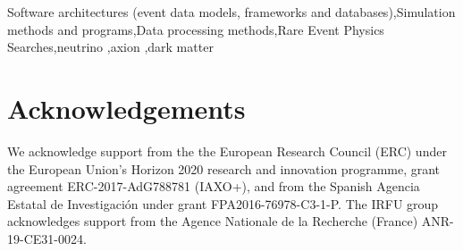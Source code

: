 \documentclass[article]{elsarticle}
\begin{document}
\begin{frontmatter}
\begin{abstract}

\end{abstract}

\begin{keyword}
Software architectures (event data models, frameworks and databases)\sep Simulation methods and programs\sep Data processing methods\sep Rare Event Physics Searches\sep neutrino \sep axion \sep dark matter
\end{keyword}

\end{frontmatter}

\linenumbers







\section*{Acknowledgements}
We acknowledge support from the the European Research Council (ERC) under the European Union’s Horizon 2020 research and innovation programme, grant agreement ERC-2017-AdG788781 (IAXO+), and from the Spanish Agencia Estatal de Investigaci\'on under grant FPA2016-76978-C3-1-P. The IRFU group acknowledges support from the Agence Nationale de la Recherche (France) ANR-19-CE31-0024.

%

\end{document}
